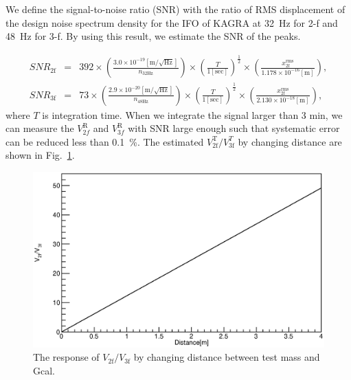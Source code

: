 \documentclass[A4]{spie}  %
\begin{document}
We define the signal-to-noise ratio (SNR) with the ratio of RMS displacement of the design noise spectrum density for the IFO of KAGRA at 32~Hz for 2-f and 48~Hz for 3-f.
By using this result, we estimate the SNR of the peaks.

\footnotesize
\begin{eqnarray}
\!S\!N\!R_{\mathrm{2f}}&=&392 \times \left(\frac{3.0 \times 10^{-19} [\mathrm{m/\sqrt{Hz}}]}{n_{\mathrm{32Hz}}} \right)  \times \left(\frac{T}{1 [\mathrm{sec}]} \right)^{\frac{1}{2}} \times\left(\frac{x_{\mathrm{2f}}^{\mathrm{rms}}}{1.178 \times 10^{-16}\mathrm{[m]} }  \right),   \\
\!S\!N\!R_{\mathrm{3f}}&=&73 \times \left(\frac{2.9 \times 10^{-20} [\mathrm{m/\sqrt{Hz}}]}{n_{\mathrm{48Hz}}} \right) \times \left(\frac{T}{1 [\mathrm{sec}]} \right)^{\frac{1}{2}}  \times \left(\frac{x_{\mathrm{2f}}^{\mathrm{rms}}}{2.130 \times 10^{-18}\mathrm{[m] }} \right),
\end{eqnarray}
\normalsize
where $T$ is integration time. When we integrate the signal larger than 3 min, we can measure the $V^{\mathrm{R}}_{2f}$ and $V^{\mathrm{R}}_{3f}$ with SNR large enough such that systematic error can be reduced less than 0.1~\%. 
The estimated $V^{\mathrm{T}}_{\mathrm{2f}}/V^{T}_{\mathrm{3f}}$ by changing distance are shown in Fig.~\ref{fig:dvsVV}.
\begin{figure}
\begin{center}
\includegraphics[width=12cm]{dvsVV.eps}
\caption{The response of $V_{\mathrm{2f}}/V_{\mathrm{3f}}$ by changing distance between test mass and Gcal.}
\label{fig:dvsVV}
\end{center}
\end{figure}
\end{document}
